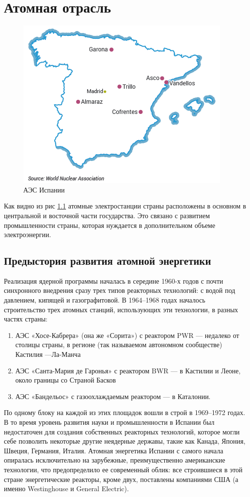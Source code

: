 \chapter{Атомная отрасль}

\begin{figure}[h]
	\begin{center}
		\includegraphics[width=.5\columnwidth]{./img/world_n_a.png}
	\end{center}
	\caption{АЭС Испании}
	\label{pic:mapOfNPP}
\end{figure}

Как видно из рис \ref{pic:mapOfNPP} атомные электростанции страны расположены в основном в центральной и восточной части государства. Это связано с развитием промышленности страны, которая нуждается в дополнительном объеме электроэнергии.

\section{Предыстория развития атомной энергетики}

Реализация ядерной программы началась в середине 1960-х годов с почти синхронного внедрения сразу трех типов реакторных технологий: с водой под давлением, кипящей и газографитовой. В 1964–1968 годах началось строительство трех атомных станций, использующих эти технологии, в разных частях страны:
\begin{enumerate}
	\item АЭС «Хосе-Кабрера» (она же «Сорита») с реактором PWR — недалеко от столицы страны, в регионе (так называемом автономном сообществе) Кастилия —Ла-Манча
	\item  АЭС «Санта-Мария де Гаронья» с реактором BWR — в Кастилии и Леоне, около границы со Страной Басков
	\item АЭС «Бандельос» с газоохлаждаемым реактором — в Каталонии.
\end{enumerate}  

По одному блоку на каждой из этих площадок вошли в строй в 1969–1972 годах. В то время уровень развития науки и промышленности в Испании был недостаточен для создания собственных реакторных технологий, которое могли себе позволить некоторые другие неядерные державы, такие как Канада, Япония, Швеция, Германия, Италия. Атомная энергетика Испании с самого начала опиралась исключительно на зарубежные, преимущественно американские технологии, что предопределило ее современный облик: все строившиеся в этой стране энергетические реакторы, кроме двух, поставлены компаниями США (а именно Westinghouse и General Electric).

